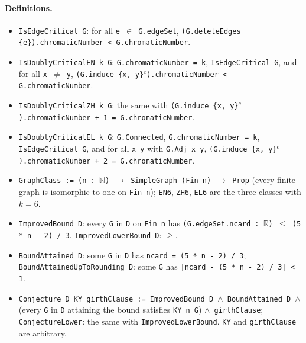 \documentclass[11pt]{article}
\theoremstyle{definition}
\theoremstyle{remark}
\renewcommand{\_}{\oldus\allowbreak}
\begin{document}
\paragraph{Definitions.}
\begin{itemize}
  \item \texttt{IsEdgeCritical G}: for all \texttt{e $\in$ G.edgeSet},
        \texttt{(G.deleteEdges \{e\}).chromaticNumber < G.chromaticNumber}.
  \item \texttt{IsDoublyCriticalEN k G}: \texttt{G.chromaticNumber = k}, \texttt{IsEdgeCritical G}, and for
        all \texttt{x $\ne$ y}, \texttt{(G.induce \{x, y\}$^c$).chromaticNumber < G.chromaticNumber}.
  \item \texttt{IsDoublyCriticalZH k G}: the same with
        \texttt{(G.induce \{x, y\}$^c$).chromaticNumber + 1 = G.chromaticNumber}.
  \item \texttt{IsDoublyCriticalEL k G}: \texttt{G.Connected}, \texttt{G.chromaticNumber = k},
        \texttt{IsEdgeCritical G}, and for all \texttt{x y} with \texttt{G.Adj x y},
        \texttt{(G.induce \{x, y\}$^c$).chromaticNumber + 2 = G.chromaticNumber}.
  \item \texttt{GraphClass := (n : $\mathbb{N}$) $\to$ SimpleGraph (Fin n) $\to$ Prop} (every finite graph is
        isomorphic to one on \texttt{Fin n}); \texttt{EN6}, \texttt{ZH6}, \texttt{EL6} are the three classes with $k=6$.
  \item \texttt{ImprovedBound D}: every \texttt{G} in \texttt{D} on \texttt{Fin n} has
        \texttt{(G.edgeSet.ncard : $\mathbb{R}$) $\le$ (5 * n - 2) / 3}. \texttt{ImprovedLowerBound D}: $\ge$.
  \item \texttt{BoundAttained D}: some \texttt{G} in \texttt{D} has \texttt{ncard = (5 * n - 2) / 3};
        \texttt{BoundAttainedUpToRounding D}: some \texttt{G} has \texttt{|ncard - (5 * n - 2) / 3| < 1}.
  \item \texttt{Conjecture D KY girthClause := ImprovedBound D $\wedge$ BoundAttained D $\wedge$} (every
        \texttt{G} in \texttt{D} attaining the bound satisfies \texttt{KY n G}) \texttt{$\wedge$ girthClause};
        \texttt{ConjectureLower}: the same with \texttt{ImprovedLowerBound}. \texttt{KY} and
        \texttt{girthClause} are arbitrary.
\end{itemize}
\end{document}
